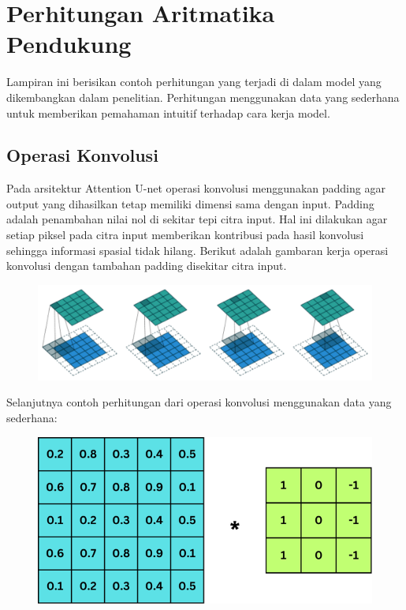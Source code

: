 \chapter{Perhitungan Aritmatika Pendukung}

\noindent Lampiran ini berisikan contoh perhitungan yang terjadi di dalam model yang dikembangkan dalam penelitian. Perhitungan menggunakan data yang sederhana untuk memberikan pemahaman intuitif terhadap cara kerja model. 

\section{Operasi Konvolusi}
\noindent Pada arsitektur Attention U-net operasi konvolusi menggunakan padding agar output yang dihasilkan tetap memiliki dimensi sama dengan input. Padding adalah penambahan nilai nol di sekitar tepi citra input. Hal ini dilakukan agar setiap piksel pada citra input memberikan kontribusi pada hasil konvolusi sehingga informasi spasial tidak hilang. Berikut adalah gambaran kerja operasi konvolusi dengan tambahan padding disekitar citra input.

\begin{figure}[H]
	\centering
	\includegraphics[scale=.3]{gambar/lampiran/stride.png}
\end{figure}

\noindent Selanjutnya contoh perhitungan dari operasi konvolusi menggunakan data yang sederhana:

\begin{figure}[H]
	\centering
	\includegraphics[scale=.3]{gambar/lampiran/konvolusi.png}
\end{figure}

